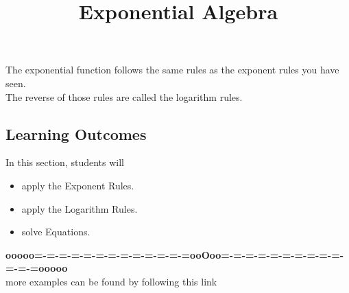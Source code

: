 \documentclass{ximera}
\title{Exponential Algebra}
\begin{document}
\begin{abstract}
\end{abstract}
\maketitle



The exponential function follows the same rules as the exponent rules you have seen. \\


The reverse of those rules are called the logarithm rules.











\subsection{Learning Outcomes}


\begin{sectionOutcomes}
In this section, students will 

\begin{itemize}
\item apply the Exponent Rules.
\item apply the Logarithm Rules.
\item solve Equations.
\end{itemize}
\end{sectionOutcomes}













\begin{center}
\textbf{\textcolor{green!50!black}{ooooo=-=-=-=-=-=-=-=-=-=-=-=-=ooOoo=-=-=-=-=-=-=-=-=-=-=-=-=ooooo}} \\

more examples can be found by following this link\\ 

\end{center}
\end{document}
